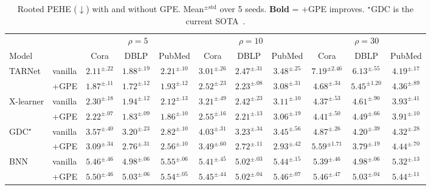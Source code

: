 \documentclass[sigconf,anonymous,review]{acmart}
\begin{document}
\begin{table}[t]
\caption{Rooted PEHE ($\downarrow$) with and without GPE. Mean$^{\pm\text{std}}$ over 5 seeds. \textbf{Bold} = +GPE improves. $^\star$GDC is the current SOTA~\cite{hu2025gdc}.}
\label{tab:main}
\centering
\footnotesize
\setlength{\tabcolsep}{3.0pt}
\begin{tabular}{@{}l l ccc ccc ccc@{}}
\toprule
& & \multicolumn{3}{c}{$\rho=5$} & \multicolumn{3}{c}{$\rho=10$} & \multicolumn{3}{c}{$\rho=30$} \\
\cmidrule(lr){3-5} \cmidrule(lr){6-8} \cmidrule(lr){9-11}
Model & & Cora & DBLP & PubMed & Cora & DBLP & PubMed & Cora & DBLP & PubMed \\
\midrule
\multirow{2}{*}{TARNet} & vanilla & $2.11^{\pm.22}$ & $1.88^{\pm.19}$ & $2.21^{\pm.10}$ & $3.01^{\pm.26}$ & $2.47^{\pm.31}$ & $3.48^{\pm.25}$ & $7.19^{\pm2.46}$ & $6.13^{\pm.55}$ & $4.19^{\pm.17}$ \\
& +GPE & $\mathbf{1.87}^{\pm.11}$ & $\mathbf{1.72}^{\pm.12}$ & $\mathbf{1.93}^{\pm.12}$ & $\mathbf{2.52}^{\pm.23}$ & $\mathbf{2.23}^{\pm.08}$ & $\mathbf{3.08}^{\pm.31}$ & $\mathbf{4.68}^{\pm.34}$ & $\mathbf{5.45}^{\pm1.20}$ & $4.36^{\pm.89}$ \\
\midrule
\multirow{2}{*}{X-learner} & vanilla & $2.30^{\pm.18}$ & $1.94^{\pm.12}$ & $2.12^{\pm.13}$ & $3.21^{\pm.49}$ & $2.42^{\pm.23}$ & $3.11^{\pm.10}$ & $4.37^{\pm.53}$ & $4.61^{\pm.90}$ & $3.93^{\pm.41}$ \\
& +GPE & $\mathbf{2.22}^{\pm.07}$ & $\mathbf{1.83}^{\pm.09}$ & $\mathbf{1.86}^{\pm.10}$ & $\mathbf{2.55}^{\pm.16}$ & $\mathbf{2.21}^{\pm.13}$ & $\mathbf{3.06}^{\pm.19}$ & $4.41^{\pm.50}$ & $\mathbf{4.49}^{\pm.66}$ & $\mathbf{3.91}^{\pm.10}$ \\
\midrule
\multirow{2}{*}{GDC$^\star$} & vanilla & $3.57^{\pm.40}$ & $3.20^{\pm.23}$ & $2.82^{\pm.10}$ & $4.03^{\pm.31}$ & $3.23^{\pm.34}$ & $3.45^{\pm.56}$ & $4.87^{\pm.26}$ & $4.20^{\pm.39}$ & $4.32^{\pm.28}$ \\
& +GPE & $\mathbf{3.09}^{\pm.34}$ & $\mathbf{2.76}^{\pm.31}$ & $\mathbf{2.56}^{\pm.10}$ & $\mathbf{3.49}^{\pm.60}$ & $\mathbf{2.72}^{\pm.11}$ & $\mathbf{2.93}^{\pm.42}$ & $5.59^{\pm1.71}$ & $\mathbf{3.79}^{\pm.19}$ & $4.44^{\pm.70}$ \\
\midrule
\multirow{2}{*}{BNN} & vanilla & $5.46^{\pm.46}$ & $4.98^{\pm.06}$ & $5.55^{\pm.06}$ & $5.41^{\pm.45}$ & $5.02^{\pm.03}$ & $5.44^{\pm.15}$ & $5.39^{\pm.46}$ & $4.98^{\pm.06}$ & $5.32^{\pm.13}$ \\
& +GPE & $5.50^{\pm.46}$ & $5.03^{\pm.06}$ & $5.54^{\pm.05}$ & $5.45^{\pm.44}$ & $5.02^{\pm.04}$ & $5.46^{\pm.07}$ & $5.46^{\pm.47}$ & $5.03^{\pm.04}$ & $5.44^{\pm.11}$ \\
\bottomrule
\end{tabular}
\end{table}
\end{document}
